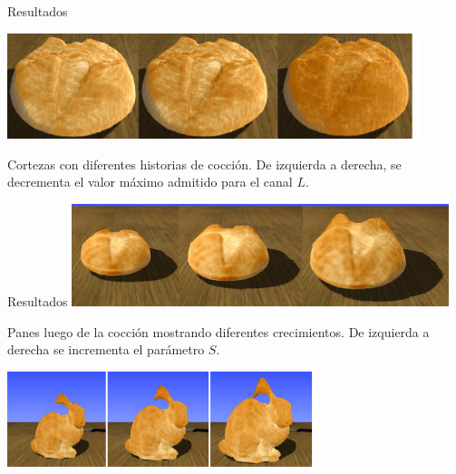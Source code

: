 \documentclass[spanish,unknownkeysallowed]{beamer}
\begin{document}
\begin{frame}{Resultados}

\centerline{\includegraphics[width=12cm]{../figures/Fig13}}
Cortezas con diferentes historias de cocción. De izquierda a derecha, se decrementa el valor máximo admitido para el canal $L$.

\end{frame}

\begin{frame}{Resultados}
\includegraphics[width=11cm]{../figures/Fig14}

Panes luego de la cocción mostrando diferentes crecimientos. De izquierda a derecha se incrementa el parámetro $S$.

\includegraphics[width=9cm]{../figures/Fig15}


\end{frame}


\end{document}
